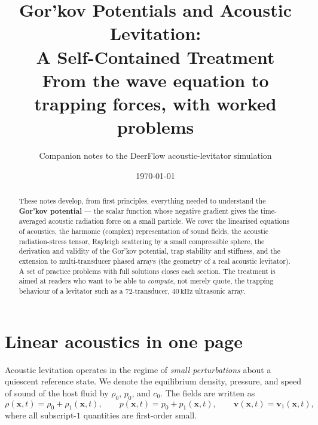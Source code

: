\documentclass[11pt]{article}
\title{\bfseries Gor'kov Potentials and Acoustic Levitation:\\ A Self-Contained Treatment\\[0.4em]
\large From the wave equation to trapping forces, with worked problems}
\author{Companion notes to the DeerFlow acoustic-levitator simulation}
\date{\today}
\newcommand{\rrho}{\rho_{0}}
\newcommand{\cc}{c_{0}}
\newcommand{\vv}{\mathbf{v}}
\newcommand{\xx}{\mathbf{x}}
\begin{document}
\maketitle

\begin{abstract}
These notes develop, from first principles, everything needed to understand the
\textbf{Gor'kov potential} --- the scalar function whose negative gradient gives
the time-averaged acoustic radiation force on a small particle. We cover the
linearised equations of acoustics, the harmonic (complex) representation of
sound fields, the acoustic radiation-stress tensor, Rayleigh scattering by a
small compressible sphere, the derivation and validity of the Gor'kov potential,
trap stability and stiffness, and the extension to multi-transducer phased arrays
(the geometry of a real acoustic levitator). A set of practice problems with full
solutions closes each section. The treatment is aimed at readers who want to be
able to \emph{compute}, not merely quote, the trapping behaviour of a levitator
such as a $72$-transducer, $40\,\mathrm{kHz}$ ultrasonic array.
\end{abstract}

\tableofcontents

\section{Linear acoustics in one page}
\label{sec:linear}

Acoustic levitation operates in the regime of \emph{small perturbations} about a
quiescent reference state. We denote the equilibrium density, pressure, and speed
of sound of the host fluid by $\rrho$, $p_{0}$, and $\cc$. The fields are written
as
\begin{equation}
  \rho(\xx,t)=\rrho+\rho_{1}(\xx,t),\qquad
  p(\xx,t)=p_{0}+p_{1}(\xx,t),\qquad
  \vv(\xx,t)=\vv_{1}(\xx,t),
\end{equation}
where all subscript-$1$ quantities are first-order small.
\end{document}

